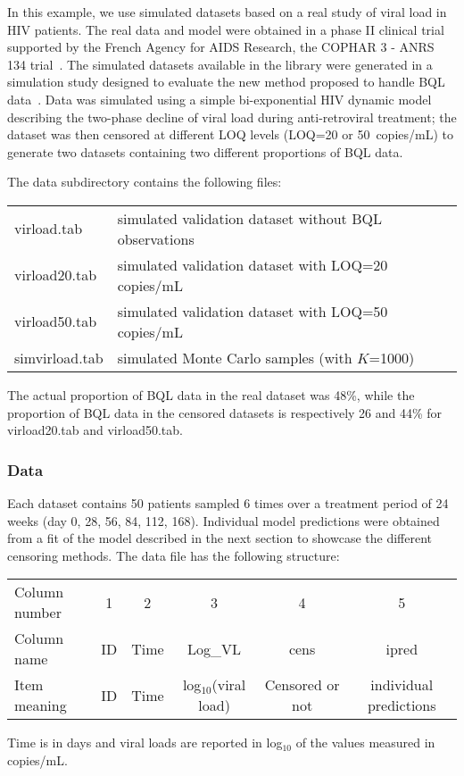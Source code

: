 \hskip 18pt In this example, we use simulated datasets based on a real study of viral load in HIV patients. The real data and model were obtained in a phase II clinical trial supported by the French Agency for AIDS Research, the COPHAR 3 - ANRS 134 trial~\cite{GoujardISA2010}. The simulated datasets available in the library were generated in a simulation study designed to evaluate the new method proposed to handle BQL data~\cite{Nguyen2012}. Data was simulated using a simple bi-exponential HIV dynamic model describing the two-phase decline of viral load during anti-retroviral treatment; the dataset was then censored at different LOQ levels (LOQ=20 or 50~copies/mL) to generate two datasets containing two different proportions of BQL data.

The {\sf data} subdirectory contains the following files:
\begin{center}
\begin{tabular} {l l}
\hline
virload.tab & simulated validation dataset without BQL observations \\
virload20.tab & simulated validation dataset with LOQ=20 copies/mL \\
virload50.tab & simulated validation dataset with LOQ=50 copies/mL\\
simvirload.tab & simulated Monte Carlo samples (with $K$=1000) \\
\hline
\end{tabular}
\end{center}
The actual proportion of BQL data in the real dataset was 48\%, while the proportion of BQL data in the censored datasets is respectively 26 and 44\% for virload20.tab and virload50.tab.

\subsubsection{Data}

\hskip 18pt Each dataset contains 50 patients sampled 6 times over a treatment period of 24 weeks (day 0, 28, 56, 84, 112, 168). Individual model predictions were obtained from a fit of the model described in the next section to showcase the different censoring methods. The data file has the following structure:
\begin{center}
\begin{tabular} {l c c c c c}
\hline
Column number & 1 & 2 & 3 & 4 & 5\\
Column name & ID & Time & Log\_VL & cens & ipred \\
Item meaning & ID & Time & log$_{10}$(viral load) & Censored or not & individual predictions \\
\hline
\end{tabular}
\end{center}
Time is in days and viral loads are reported in log$_{10}$ of the values measured in copies/mL.


